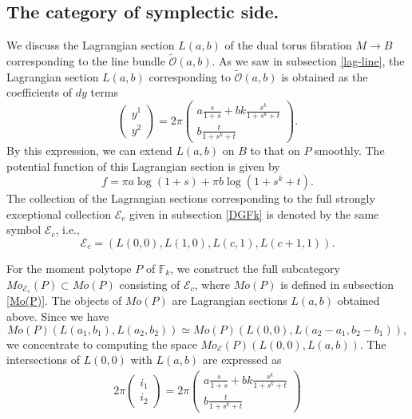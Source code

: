 \documentclass[12pt,reqno]{amsart}
\newcommand{\F}{{\mathbb{F}}}
\newcommand{\Fk}{{\F_k}}
\newcommand{\cO}{{\mathcal{O}}}
\newcommand{\cE}{{\mathcal{E}}}
\theoremstyle{definition}
\begin{document}
\subsection{The category of symplectic side.}\label{morse homotopy}
We discuss the Lagrangian section $L(a,b)$ of the dual torus fibration $M\to B$ corresponding to the line bundle $\widetilde{\cO}(a,b)$. As we saw in subsection \ref{lag-line}, the Lagrangian section $L(a,b)$ corresponding to $\widetilde{\cO}(a,b)$ is obtained as the coefficients of $dy$ terms
\begin{equation}
\begin{pmatrix}
y^1 \\ y^2
\end{pmatrix}
=2\pi
\begin{pmatrix}
 a\frac{s}{1+s} +  bk\frac{s^k}{1+s^k+t} \\  b\frac{t}{1+s^k+t}
\end{pmatrix}.
\end{equation}
By this expression, we can extend $L(a,b)$ on $B$ to that on $P$ smoothly.
The potential function of this Lagrangian section is given by
\begin{equation}\label{fabc}
f =  \pi a\log(1+s) +  \pi b\log(1+s^k+t).
\end{equation}
The collection of the Lagrangian sections corresponding to the full strongly exceptional collection $\cE_c$ given in subsection \ref{DGFk} is denoted by the same symbol $\cE_c$, i.e.,
\begin{equation*}
\cE_c=\left(L(0,0),L(1,0),L(c,1),L(c+1,1)\right).
\end{equation*}\par
For the moment polytope $P$ of $\Fk$, we construct the full subcategory $Mo_{\cE_c}(P)\subset Mo(P)$ consisting of $\cE_c$, where $Mo(P)$ is defined in subsection \ref{Mo(P)}. The objects of $Mo(P)$ are Lagrangian sections $L(a,b)$ obtained above.  Since we have
\begin{equation*}
Mo(P)(L(a_1,b_1),L(a_2,b_2)) \simeq Mo(P)(L(0,0),L(a_2-a_1,b_2-b_1)),
\end{equation*}
we concentrate to computing the space $Mo_\cE(P)(L(0,0),L(a,b))$.
The intersections of $L(0,0)$ with $L(a,b)$ are expressed as
\begin{equation}\label{eq}
\begin{split}
2\pi
\begin{pmatrix}
i_1 \\ i_2
\end{pmatrix}
=
2\pi
\begin{pmatrix}
 a\frac{s}{1+s} +  bk\frac{s^k}{1+s^k+t} \\  b\frac{t}{1+s^k+t}
\end{pmatrix}
\end{split}
\end{equation} 
\end{document}

